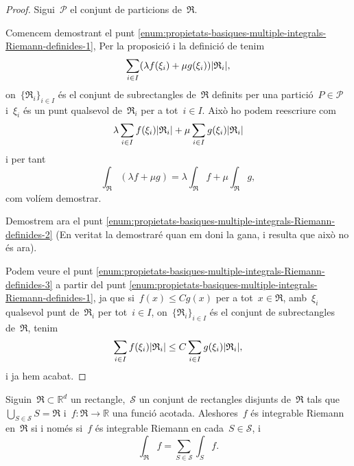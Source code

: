 \documentclass[../calcul-en-diverses-variables.tex]{subfiles}
\begin{document}
    \begin{proof}
        Sigui~\(\mathcal{P}\) el conjunt de particions de~\(\mathfrak{R}\).

        Comencem demostrant el punt \eqref{enum:propietats-basiques-multiple-integrals-Riemann-definides-1}, Per la proposició  i la definició de  tenim
        \[
            \sum_{i\in I}\left(\lambda f(\xi_{i})+\mu g(\xi_{i})\right)\abs{\mathfrak{R}_{i}},
        \]
        on~\(\{\mathfrak{R}_{i}\}_{i\in I}\) és el conjunt de subrectangles de~\(\mathfrak{R}\) definits per una partició~\(P\in\mathcal{P}\) i~\(\xi_{i}\) és un punt qualsevol de~\(\mathfrak{R}_{i}\) per a tot~\(i\in I\).
        Això ho podem reescriure com
        \[
            \lambda\sum_{i\in I}f(\xi_{i})\abs{\mathfrak{R}_{i}}+\mu\sum_{i\in I}g(\xi_{i})\abs{\mathfrak{R}_{i}}
        \]
        i per tant
        \[
            \int_{\mathfrak{R}}(\lambda f+\mu g)=\lambda\int_{\mathfrak{R}}f+\mu\int_{\mathfrak{R}}g,
        \]
        com volíem demostrar.

        Demostrem ara el punt \eqref{enum:propietats-basiques-multiple-integrals-Riemann-definides-2} (En veritat la demostraré quan em doni la gana, i resulta que això no és ara).

        Podem veure el punt \eqref{enum:propietats-basiques-multiple-integrals-Riemann-definides-3} a partir del punt \eqref{enum:propietats-basiques-multiple-integrals-Riemann-definides-1}, ja que si~\(f(x)\leq Cg(x)\) per a tot~\(x\in \mathfrak{R}\), amb~\(\xi_{i}\) qualsevol punt de~\(\mathfrak{R}_{i}\) per tot~\(i\in I\), on~\(\{\mathfrak{R}_{i}\}_{i\in I}\) és el conjunt de subrectangles de~\(\mathfrak{R}\), tenim
        \[
            \sum_{i\in I}f(\xi_{i})\abs{\mathfrak{R}_{i}}\leq C\sum_{i\in I}g(\xi_{i})\abs{\mathfrak{R}_{i}},
        \]
        i ja hem acabat.
    \end{proof}
    \begin{theorem}
        \label{thm:podem-partir-les-integrals-Riemann}
        Siguin~\({{\mathfrak{R}}}\subset\mathbb{R}^{d}\) un rectangle,~\(\mathcal{S}\) un conjunt de rectangles disjunts de~\(\mathfrak{R}\) tals que~\(\bigcup_{S\in\mathcal{S}}S=\mathfrak{R}\) i~\(f\colon\mathfrak{R}\to\mathbb{R}\) una funció acotada.
        Aleshores~\(f\) és integrable Riemann en~\(\mathfrak{R}\) si i només si~\(f\) és integrable Riemann en cada~\(S\in\mathcal{S}\), i
        \[
            \int_{\mathfrak{R}}f=\sum_{S\in\mathcal{S}}\int_{S}f.
        \]
    \end{theorem}
\end{document}
